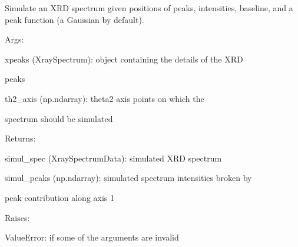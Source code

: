 \documentclass[letterpaper,10pt,english]{sphinxmanual}
\begin{document}
\begin{fulllineitems}
\begin{fulllineitems}
\label{doctree/soprano.calculate.xrd.xrd:soprano.calculate.xrd.xrd.XRDCalculator.spec_simul}
Simulate an XRD spectrum given positions of peaks, intensities,
baseline, and a peak function (a Gaussian by default).

\begin{DUlineblock}{0em}
\item[] Args:
\item[]
\begin{DUlineblock}{\DUlineblockindent}
\item[] xpeaks (XraySpectrum): object containing the details of the XRD
\item[]
\begin{DUlineblock}{\DUlineblockindent}
\item[] peaks
\end{DUlineblock}
\item[] th2\_axis (np.ndarray): theta2 axis points on which the
\item[]
\begin{DUlineblock}{\DUlineblockindent}
\item[] spectrum should be simulated
\end{DUlineblock}
\end{DUlineblock}
\end{DUlineblock}

\begin{DUlineblock}{0em}
\item[] Returns:
\item[]
\begin{DUlineblock}{\DUlineblockindent}
\item[] simul\_spec (XraySpectrumData): simulated XRD spectrum
\item[] simul\_peaks (np.ndarray): simulated spectrum intensities broken by
\item[]
\begin{DUlineblock}{\DUlineblockindent}
\item[] peak contribution along axis 1
\end{DUlineblock}
\end{DUlineblock}
\end{DUlineblock}

\begin{DUlineblock}{0em}
\item[] Raises:
\item[]
\begin{DUlineblock}{\DUlineblockindent}
\item[] ValueError: if some of the arguments are invalid
\end{DUlineblock}
\end{DUlineblock}

\end{fulllineitems}


\end{fulllineitems}
\end{document}
